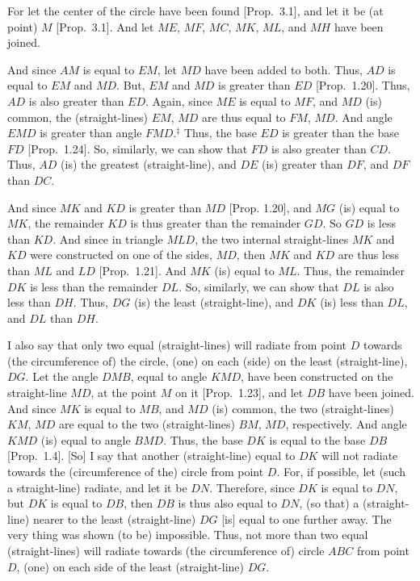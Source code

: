 \epsfysize=2.5in
\centerline{}

For let the center of the circle have been found [Prop.~3.1], and let it be (at point) $M$
[Prop.~3.1]. And let $ME$, $MF$, $MC$, $MK$, $ML$, and $MH$ have been joined.

And since $AM$ is equal to $EM$, let $MD$ have been added to both. Thus, $AD$ is equal to $EM$ and $MD$. But, $EM$ and $MD$ is greater than
$ED$ [Prop.~1.20]. Thus, $AD$ is also greater than $ED$. Again, since $ME$ is
equal to $MF$, and $MD$ (is) common, the (straight-lines) $EM$, $MD$ are thus
equal to $FM$,
$MD$. And angle $EMD$ is greater than angle $FMD$.$^\ddag$
Thus, the
base $ED$ is greater than the base $FD$ [Prop.~1.24]. 
So, similarly,
we can show that $FD$ is also greater than $CD$. Thus, $AD$ (is) the greatest
(straight-line), and $DE$ (is) greater than $DF$, and $DF$ than $DC$.

And since $MK$ and $KD$ is greater than $MD$ [Prop. 1.20], and $MG$ (is)
equal to $MK$, the remainder $KD$ is thus greater than the remainder $GD$.
So $GD$ is less than $KD$. And since in triangle $MLD$, the two internal straight-lines
$MK$ and $KD$ were constructed on one of the sides, $MD$, then $MK$ and $KD$
are thus less than $ML$ and $LD$  [Prop.~1.21]. And $MK$ (is) equal to $ML$.
Thus, the remainder $DK$ is less than the remainder $DL$. So, similarly, we
can show that $DL$ is also less than $DH$. Thus, $DG$ (is) the least (straight-line),
and $DK$ (is) less than $DL$, and $DL$ than $DH$.

I also say that only two equal (straight-lines) will radiate from point $D$ towards (the
circumference of) the circle, (one) on each (side) on the least (straight-line),
$DG$. Let the  angle $DMB$, equal to angle $KMD$, have been constructed
on the straight-line $MD$, at the point $M$ on it [Prop.~1.23], and  let $DB$ have been
joined. And since $MK$ is equal to $MB$, and $MD$ (is) common, the
two (straight-lines) $KM$, $MD$ are equal to the two (straight-lines) $BM$, $MD$,
respectively. And angle $KMD$ (is) equal to angle $BMD$. Thus, the base
$DK$ is equal to the base $DB$ [Prop.~1.4]. [So] I say that another (straight-line)
equal to $DK$ will not radiate towards the (circumference of the) circle
from point $D$. For, if possible, let (such a straight-line) radiate, and let
it be $DN$. Therefore, since $DK$ is equal to $DN$, but $DK$ is equal to $DB$, then $DB$
is thus also equal to $DN$, (so that) a (straight-line) nearer to the least (straight-line) $DG$ [is]
equal to one further away. The very thing was shown (to be)  impossible. 
Thus, not more than two equal (straight-lines) will radiate towards
(the circumference of) circle $ABC$ from point $D$, (one) on each side
of the least (straight-line) $DG$.

